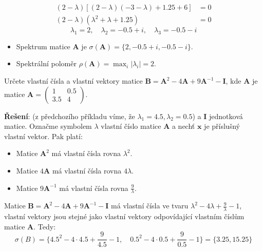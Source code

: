 \begin{example}
\begin{align}
          (2-\lambda)[(2-\lambda)(-3-\lambda)+1.25+6]            &= 0           \nonumber\\
          (2-\lambda)(\lambda^2+\lambda+1.25)                    &= 0           \nonumber
        \end{align}
        \begin{equation*}
          \lambda_1 = 2, \quad\lambda_2 = -0.5+i, \quad\lambda_3=-0.5-i
        \end{equation*}
        \begin{itemize}
          \item Spektrum matice $\mathbf{A}$ je $\sigma(\mathbf{A})=\{2,-0.5+i,-0.5-i\}$.
          \item Spektrální poloměr $\rho(\mathbf{A})=\max_i|\lambda_i|=2$.
        \end{itemize}
      \end{example}

      
      \begin{example}
        Určete vlastní čísla a vlastní vektory matice
        $\mathbf{B}=\mathbf{A}^2-4\mathbf{A}+9\mathbf{A}^{-1}-\mathbf{I}$, kde $\mathbf{A}$ je matice
        $\mathbf{A}=\left(\begin{array}{cc}1&0.5\\3.5&4\end{array}\right)$.
  
        \textbf{Řešení}: (z předchozího příkladu víme, že $\lambda_1=4.5, \lambda_2=0.5$) a
         $\mathbf{I}$ jednotková matice. Označme symbolem $\lambda$ vlastní číslo matice $\mathbf{A}$
         a nechť $\mathbf{x}$ je příslušný vlastní vektor. Pak platí:
         \begin{itemize}
           \item Matice $\mathbf{A}^2$ má vlastní čísla rovna $\lambda^2$.
           \item Matice $4\mathbf{A}$ má vlastní čísla rovna $4\lambda$.
           \item Matice $9\mathbf{A}^{-1}$ má vlastní čísla rovna $\frac{9}{\lambda}$.
         \end{itemize}
         Matice $\mathbf{B}=\mathbf{A}^2-4\mathbf{A}+9\mathbf{A}^{-1}-\mathbf{I}$ má vlastní čísla ve
         tvaru  $\lambda^2-4\lambda+\frac{9}{\lambda}-1$, vlastní vektory jsou stejné jako vlastní
         vektory odpovídající vlastním číslům matice $\mathbf{A}$. Tedy:
         \begin{equation*}
             \sigma(B)=\{4.5^2-4\cdot4.5+\frac{9}{4.5}-1,\quad
             0.5^2-4\cdot0.5+\frac{9}{0.5}-1\}=\{3.25, 15.25\}
         \end{equation*}
      \end{example}
      
